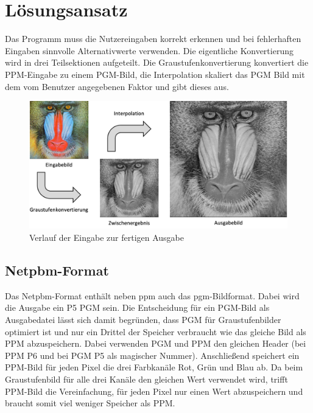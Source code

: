 \documentclass[course=erap]{aspdoc}
\begin{document}
\section{Lösungsansatz}
Das Programm muss die Nutzereingaben korrekt erkennen und bei fehlerhaften Eingaben sinnvolle Alternativwerte verwenden.
Die eigentliche Konvertierung wird in drei Teilsektionen aufgeteilt. Die Graustufenkonvertierung konvertiert die PPM-Eingabe zu einem PGM-Bild, die Interpolation skaliert das PGM Bild mit dem vom Benutzer angegebenen Faktor und gibt dieses aus.

\begin{figure}[h]
    \centering
    \includegraphics[scale=0.8]{Ausarbeitung/assets/verlauf.png}
    \caption{Verlauf der Eingabe zur fertigen Ausgabe}
    \label{fig:verlauf}
\end{figure}


\subsection{Netpbm-Format}
Das Netpbm-Format enthält neben ppm auch das pgm-Bildformat. Dabei wird die Ausgabe ein P5 PGM sein. Die Entscheidung für ein PGM-Bild als Ausgabedatei lässt sich damit begründen, dass PGM für Graustufenbilder optimiert ist und nur ein Drittel der Speicher verbraucht wie das gleiche Bild als PPM abzuspeichern. Dabei verwenden PGM und PPM den gleichen Header (bei PPM P6 und bei PGM P5 als magischer Nummer). Anschließend speichert ein PPM-Bild für jeden Pixel die drei Farbkanäle Rot, Grün und Blau ab. Da beim Graustufenbild für alle drei Kanäle den gleichen Wert verwendet wird, trifft PPM-Bild die Vereinfachung, für jeden Pixel nur einen Wert abzuspeichern und braucht somit viel weniger Speicher als PPM.
\end{document}
